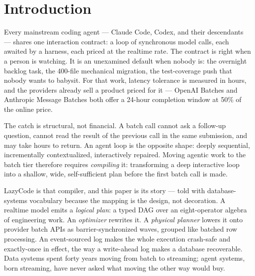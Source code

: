 \documentclass[11pt]{article}
\begin{document}
\section{Introduction}
\label{sec:intro}

Every mainstream coding agent --- Claude Code, Codex, and their descendants --- shares one interaction contract: a loop of synchronous model calls, each awaited by a harness, each priced at the realtime rate. The contract is right when a person is watching. It is an unexamined default when nobody is: the overnight backlog task, the 400-file mechanical migration, the test-coverage push that nobody wants to babysit. For that work, latency tolerance is measured in hours, and the providers already sell a product priced for it --- OpenAI Batches and Anthropic Message Batches both offer a 24-hour completion window at 50\% of the online price.

The catch is structural, not financial. A batch call cannot ask a follow-up question, cannot read the result of the previous call in the same submission, and may take hours to return. An agent loop is the opposite shape: deeply sequential, incrementally contextualized, interactively repaired. Moving agentic work to the batch tier therefore requires \emph{compiling} it: transforming a deep interactive loop into a shallow, wide, self-sufficient plan before the first batch call is made.

LazyCode is that compiler, and this paper is its story --- told with database-systems vocabulary because the mapping is the design, not decoration. A realtime model emits a \emph{logical plan}: a typed DAG over an eight-operator algebra of engineering work. An \emph{optimizer} rewrites it. A \emph{physical planner} lowers it onto provider batch APIs as barrier-synchronized waves, grouped like batched row processing. An event-sourced log makes the whole execution crash-safe and exactly-once in effect, the way a write-ahead log makes a database recoverable. Data systems spent forty years moving from batch to streaming; agent systems, born streaming, have never asked what moving the other way would buy.
\end{document}
